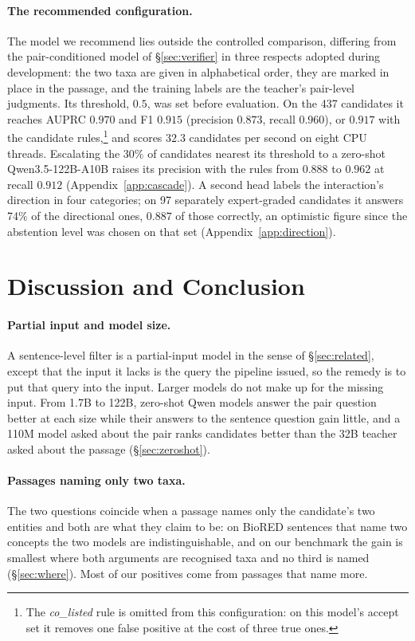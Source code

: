 \documentclass[11pt]{article}
\begin{document}
\paragraph{The recommended configuration.}\label{sec:deploy}
The model we recommend lies outside the controlled comparison, differing from the pair-conditioned
model of \S\ref{sec:verifier} in three respects adopted during development: the two taxa are given
in alphabetical order, they are marked in place in the passage, and the training labels are the
teacher's pair-level judgments. Its threshold, $0.5$, was set before evaluation. On the 437
candidates it reaches AUPRC $0.970$ and F1 $0.915$ (precision $0.873$, recall $0.960$), or $0.917$
with the candidate rules,\footnote{The \emph{co\_listed} rule is omitted from this configuration: on
this model's accept set it removes one false positive at the cost of three true ones.} and scores
$32.3$ candidates per second on eight CPU threads. Escalating the $30\%$ of candidates nearest its
threshold to a zero-shot Qwen3.5-122B-A10B raises its precision with the rules from $0.888$ to $0.962$ at recall $0.912$
(Appendix~\ref{app:cascade}). A second head labels the interaction's direction in four categories;
on 97 separately expert-graded candidates it answers 74\% of the directional ones, $0.887$ of those
correctly, an optimistic figure since the abstention level was chosen on that set
(Appendix~\ref{app:direction}).

\section{Discussion and Conclusion}
\label{sec:discussion}
\label{sec:conclusion}

\paragraph{Partial input and model size.}
A sentence-level filter is a partial-input model in the sense of \S\ref{sec:related}, except that
the input it lacks is the query the pipeline issued, so the remedy is to put that query into
the input. Larger models do not make up for the missing input. From 1.7B to 122B, zero-shot Qwen models answer the pair
question better at each size while their answers to the sentence question gain little, and a
110M model asked about the pair ranks candidates better than the 32B teacher asked about
the passage (\S\ref{sec:zeroshot}).

\paragraph{Passages naming only two taxa.}
The two questions coincide when a passage names only the candidate's two entities and both are
what they claim to be: on BioRED sentences that name two concepts the two models are
indistinguishable, and on our benchmark the gain is smallest where both arguments are recognised
taxa and no third is named (\S\ref{sec:where}). Most of our positives come from passages that name
more.
\end{document}
